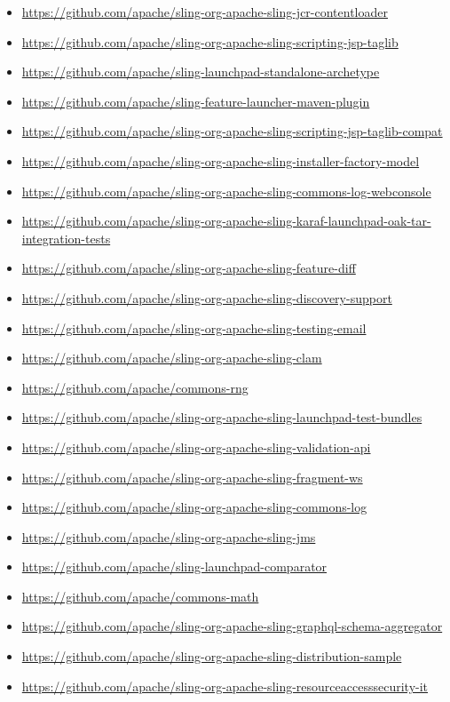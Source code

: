 \documentclass[sigconf]{acmart}
\begin{document}
\begin{itemize}
  \item \url{https://github.com/apache/sling-org-apache-sling-jcr-contentloader}
  \item \url{https://github.com/apache/sling-org-apache-sling-scripting-jsp-taglib}
  \item \url{https://github.com/apache/sling-launchpad-standalone-archetype}
  \item \url{https://github.com/apache/sling-feature-launcher-maven-plugin}
  \item \url{https://github.com/apache/sling-org-apache-sling-scripting-jsp-taglib-compat}
  \item \url{https://github.com/apache/sling-org-apache-sling-installer-factory-model}
  \item \url{https://github.com/apache/sling-org-apache-sling-commons-log-webconsole}
  \item \url{https://github.com/apache/sling-org-apache-sling-karaf-launchpad-oak-tar-integration-tests}
  \item \url{https://github.com/apache/sling-org-apache-sling-feature-diff}
  \item \url{https://github.com/apache/sling-org-apache-sling-discovery-support}
  \item \url{https://github.com/apache/sling-org-apache-sling-testing-email}
  \item \url{https://github.com/apache/sling-org-apache-sling-clam}
  \item \url{https://github.com/apache/commons-rng}
  \item \url{https://github.com/apache/sling-org-apache-sling-launchpad-test-bundles}
  \item \url{https://github.com/apache/sling-org-apache-sling-validation-api}
  \item \url{https://github.com/apache/sling-org-apache-sling-fragment-ws}
  \item \url{https://github.com/apache/sling-org-apache-sling-commons-log}
  \item \url{https://github.com/apache/sling-org-apache-sling-jms}
  \item \url{https://github.com/apache/sling-launchpad-comparator}
  \item \url{https://github.com/apache/commons-math}
  \item \url{https://github.com/apache/sling-org-apache-sling-graphql-schema-aggregator}
  \item \url{https://github.com/apache/sling-org-apache-sling-distribution-sample}
  \item \url{https://github.com/apache/sling-org-apache-sling-resourceaccesssecurity-it}

\end{itemize}
\end{document}
